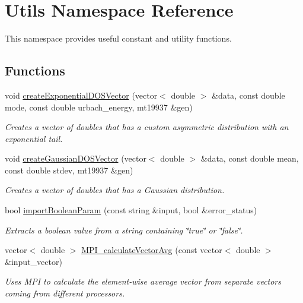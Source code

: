 \hypertarget{namespace_utils}{}\section{Utils Namespace Reference}
\label{namespace_utils}


This namespace provides useful constant and utility functions.  


\subsection*{Functions}
\begin{DoxyCompactItemize}
\item 
void \hyperlink{namespace_utils_ad895b1edcec8254af3279938d0ed4ac0}{create\+Exponential\+D\+O\+S\+Vector} (vector$<$ double $>$ \&data, const double mode, const double urbach\+\_\+energy, mt19937 \&gen)
\begin{DoxyCompactList}\small\item\em Creates a vector of doubles that has a custom asymmetric distribution with an exponential tail. \end{DoxyCompactList}\item 
void \hyperlink{namespace_utils_a564bff107c9e05003ff99593968a86fc}{create\+Gaussian\+D\+O\+S\+Vector} (vector$<$ double $>$ \&data, const double mean, const double stdev, mt19937 \&gen)
\begin{DoxyCompactList}\small\item\em Creates a vector of doubles that has a Gaussian distribution. \end{DoxyCompactList}\item 
bool \hyperlink{namespace_utils_afac80acf3a99a5cd96b84bffb4becbb4}{import\+Boolean\+Param} (const string \&input, bool \&error\+\_\+status)
\begin{DoxyCompactList}\small\item\em Extracts a boolean value from a string containing \char`\"{}true\char`\"{} or \char`\"{}false\char`\"{}. \end{DoxyCompactList}\item 
vector$<$ double $>$ \hyperlink{namespace_utils_ac9a27519719bf1493bb2b4f56b0019c9}{M\+P\+I\+\_\+calculate\+Vector\+Avg} (const vector$<$ double $>$ \&input\+\_\+vector)
\begin{DoxyCompactList}\small\item\em Uses M\+PI to calculate the element-\/wise average vector from separate vectors coming from different processors. \end{DoxyCompactList}\item 

\end{DoxyCompactItemize}
